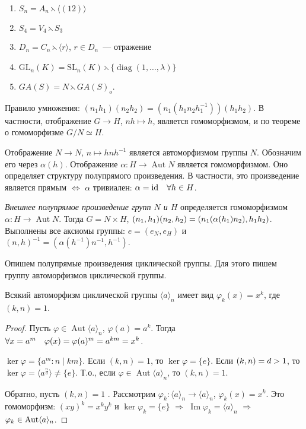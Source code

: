 \documentclass[a4paper]{article}
\renewcommand{\Aut}{\mathop{\mathrm{Aut}}\nolimits}
\renewcommand{\diag}{\mathop{\mathrm{diag}}\nolimits}
\renewcommand{\Im}{\mathop{\mathrm{Im}}\nolimits}
\newcommand*{\p}[1]{#1\nobreak\discretionary{}{\hbox{$\mathsurround=0pt #1$}}{}}
\begin{document}
\begin{ex}
\begin{enumerate}
  \item $S_n=A_n\leftthreetimes \langle(12)\rangle$
  \item $S_4=V_4\leftthreetimes S_3$
  \item $D_n=C_n\leftthreetimes \langle r\rangle$, $r\in D_n$~---
  отражение
  \item $\mathrm{GL}_n(K)=\mathrm{SL}_n(K)\leftthreetimes \{\diag(1,\ldots,\lambda)\}$
  \item $GA(S)=N\leftthreetimes GA(S)_o$.
\end{enumerate}
\end{ex}
Правило умножения: $(n_1h_1)(n_2h_2)=(n_1(h_1n_2h_1^{-1}))(h_1h_2)$.
В частности, отображение $G\to H$, $nh\mapsto h$, является
гомоморфизмом, и по теореме о гомоморфизме $G/N\simeq H$.

Отображение $N\to N$, $n\mapsto hnh^{-1}$ является автоморфизмом
группы $N$. Обозначим его через $\alpha(h)$. Отображение
$\alpha\colon H\to \Aut N$ является гомоморфизмом. Оно определяет
структуру полупрямого произведения. В частности, это произведение
является прямым $\Leftrightarrow$ $\alpha$ тривиален:
$\alpha\p=\mathrm{id}\quad \forall h\in H$.

\emph{Внешнее полупрямое произведение групп $N$ и $H$} определяется
гомоморфизмом $\alpha\colon H\to \Aut N$. Тогда $G=N\times H$,
$(n_1,h_1)(n_2,h_2)\p=(n_1(\alpha(h_1)n_2),h_1h_2)$. Выполнены все
аксиомы группы: $e=(e_N,e_H)$ и $(n,h)^{-1}=(\alpha(h^{-1})n^{-1},
h^{-1})$.

Опишем полупрямые произведения циклической группы. Для этого пишем
группу автоморфизмов циклической группы.

\begin{theorem}
Всякий автоморфизм циклической группы $\langle a\rangle_n$ имеет вид
$\varphi_k(x)=x^k$, где $(k,n)=1$.
\end{theorem}

\begin{proof}
Пусть $\varphi\in \Aut\langle a\rangle_n$, $\varphi(a)=a^k$. Тогда
$\forall x=a^m\quad \varphi(x)\p=\varphi(a)^m=a^{km}=x^k$.

$\ker\varphi=\{a^m: n\mid km\}$. Если $(k,n)=1$, то
$\ker\varphi=\{e\}$. Если $(k,n)\p=d>1$, то $\ker\varphi=\langle
a^\frac nd\rangle\neq\{e\}$. Т.о., если $\varphi\in\Aut \langle
a\rangle_n$, то $(k,n)=1$.

Обратно, пусть $(k,n)=1$ . Рассмотрим $\varphi_k\colon\langle
a\rangle_n\to \langle a\rangle_n$, $\varphi_k(x)=x^k$. Это
гомоморфизм: $(xy)^k=x^ky^k$ и $\ker\varphi_k=\{e\}$ $\Rightarrow$
$\Im \varphi_k=\langle a\rangle_n$ $\Rightarrow$ $\varphi_k\p\in
\Aut \langle a\rangle_n$.
\end{proof}
\end{document}
